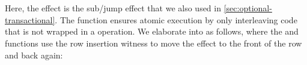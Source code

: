 \begin{code}[hide]
\>[41]\AgdaSymbol{=}\<%
\\
\>[10][@{}l@{\AgdaIndent{0}}]%
\>[12]\AgdaSpace{}%
\AgdaSymbol{(}\AgdaSpace{}%
\AgdaSymbol{(}\AgdaSpace{}%
\AgdaSymbol{(}\AgdaSpace{}%
\AgdaSymbol{))}\AgdaSpace{}%
\AgdaSymbol{(}\AgdaSpace{}%
\AgdaSymbol{(}\AgdaSpace{}%
\AgdaSymbol{)))}\AgdaSpace{}%
\AgdaSpace{}%
\<%
\\
%
\>[10]\AgdaSpace{}%
\AgdaSpace{}%
\AgdaSymbol{(}\AgdaSpace{}%
\AgdaSpace{}%
\AgdaOperator{\AgdaInductiveConstructor{,}}\AgdaSpace{}%
\AgdaSpace{}%
\AgdaOperator{\AgdaInductiveConstructor{,}}\AgdaSpace{}%
\AgdaSymbol{)}%
\>[42]\AgdaSymbol{=}\AgdaSpace{}%
\AgdaSpace{}%
\AgdaSpace{}%
\AgdaSpace{}%
\AgdaSpace{}%
\AgdaSpace{}%
\AgdaSpace{}%
\AgdaSpace{}%
\AgdaSpace{}%
\AgdaSymbol{)}\AgdaSpace{}%
\<%
\end{code}
%
%
Here, the  effect is the sub/jump effect that we also used in \cref{sec:optional-transactional}.
The  function ensures atomic execution by only interleaving code that is not wrapped in a  operation.
We elaborate  into  as follows, where the  and  functions use the row insertion witness  to move the  effect to the front of the row and back again:
%
